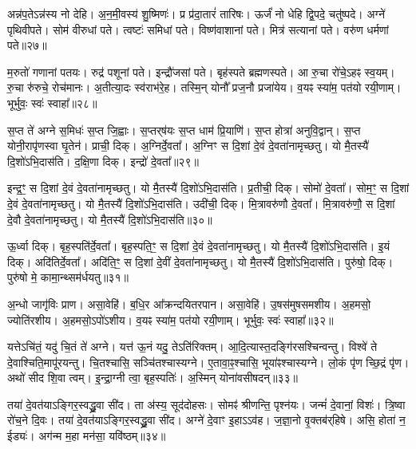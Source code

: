   अन्न॑प॒तेऽन्न॑स्य नो देहि।
   अ॒न॒मी॒वस्य॑ शु॒ष्मिणः॑।
   प्र प्र॑दा॒तारं॑ तारिषः।
   ऊर्जं॑ नो धेहि द्वि॒पदे॒ चतु॑ष्पदे।
   अग्ने॑ पृथिवीपते।
   सोम॑ वीरुधां पते।
   त्वष्टः॑ समिधां पते।
   विष्ण॑वाशानां पते।
   मित्र॑ सत्यानां पते।
   वरु॑ण धर्मणां पते॥२७॥

   म॒रुतो॑  गणानां पतयः।
   रुद्र॑ पशूनां पते।
   इन्द्रौ॑जसां पते।
   बृह॑स्पते ब्रह्मणस्पते।
   आ रु॒चा रो॑चे॒ऽहꣴ स्व॒यम्।
   रु॒चा रु॑रुचे॒ रोच॑मानः।
   अ॒तीत्या॒दः स्व॑राभ॑रे॒ह।
   तस्मि॒न् योनौ᳚ प्रज॒नौ प्रजा॑येय।
   व॒यꣴ स्या॑म॒ पत॑यो रयी॒णाम्।
   भूर्भुवः॒ स्वः॑ स्वाहा᳚॥२८॥
  \anuvakamend
  
    स॒प्त ते॑ अग्ने स॒मिधः॑ स॒प्त जि॒ह्वाः।
   स॒प्तर्{‌}ष॑यः स॒प्त धाम॑ प्रि॒याणि॑।
   स॒प्त होत्रा॑ अनुवि॒द्वान्।
   स॒प्त योनी॒रापृ॑णस्वा घृ॒तेन॑।
   प्राची॒ दिक्।
   अ॒ग्निर्दे॒वता᳚।
   अ॒ग्निꣳ स दि॒शां दे॒वं दे॒वता॑नामृच्छतु।
   यो मै॒तस्यै॑ दि॒शो॑ऽभि॒दास॑ति।
   द॒क्षि॒णा दिक्।
   इन्द्रो॑ दे॒वता᳚॥२९॥

   इन्द्र॒ꣳ॒ स दि॒शां दे॒वं दे॒वता॑नामृच्छतु।
   यो मै॒तस्यै॑ दि॒शो॑ऽभि॒दास॑ति।
   प्र॒तीची॒ दिक्।
   सोमो॑ दे॒वता᳚।
   सोम॒ꣳ॒ स दि॒शां दे॒वं दे॒वता॑नामृच्छतु।
   यो मै॒तस्यै॑ दि॒शो॑ऽभि॒दास॑ति।
   उदी॑ची॒ दिक्।
   मि॒त्रावरु॑णौ दे॒वता᳚।
   मि॒त्रावरु॑णौ॒ स दि॒शां दे॒वौ दे॒वता॑नामृच्छतु।
   यो मै॒तस्यै॑ दि॒शो॑ऽभि॒दास॑ति॥३०॥

   ऊ॒र्ध्वा दिक्।
   बृह॒स्पति॑र्दे॒वता᳚।
   बृह॒स्पति॒ꣳ॒ स दि॒शां दे॒वं दे॒वता॑नामृच्छतु।
   यो मै॒तस्यै॑ दि॒शो॑ऽभि॒दास॑ति।
   इ॒यं दिक्।
   अदि॑तिर्दे॒वता᳚।
   अदि॑ति॒ꣳ॒ स दि॒शां दे॒वीं दे॒वता॑नामृच्छतु।
   यो मै॒तस्यै॑ दि॒शो॑ऽभि॒दास॑ति।
   पुरु॑षो॒ दिक्।
   पुरु॑षो मे॒ कामा॒न्थ्सम॑र्धयतु॥३१॥
   
   अ॒न्धो जागृ॑विः प्राण।
   असा॒वेहि॑।
   ब॒धि॒र आ᳚क्रन्दयितरपान।
   असा॒वेहि॑।
   उ॒षस॑मुषसमशीय।
   अ॒हमसो॒ ज्योति॑रशीय।
   अ॒हमसो॒ऽपो॑ऽशीय।
   व॒यꣴ स्या॑म॒ पत॑यो रयी॒णाम्।
   भूर्भुवः॒ स्वः॑ स्वाहा᳚॥३२॥
\anuvakamend
  
   यत्तेऽचि॑तं॒ यदु॑ चि॒तं ते॑ अग्ने।
   यत्त॑ ऊ॒नं यदु॒ तेऽति॑रिक्तम्।
   आ॒दि॒त्यास्त॒दङ्गि॑रसश्चिन्वन्तु।
   विश्वे॑ ते दे॒वाश्चिति॒मापू॑रयन्तु।
   चि॒तश्चासि॒ सञ्चि॑तश्चास्यग्ने।
   ए॒तावा॒ꣴ॒श्चासि॒ भूया॑ꣴश्चास्यग्ने।
   लो॒कं पृ॑ण च्छि॒द्रं पृ॑ण।
   अथो॑ सीद शि॒वा त्वम्।
   इ॒न्द्रा॒ग्नी त्वा॒ बृह॒स्पतिः॑।
   अ॒स्मिन् योना॑वसीषदन्॥३३॥

   तया॑ दे॒वत॑याऽङ्गिर॒स्वद्ध्रु॒वा सी॑द।
   ता अ॑स्य॒ सूद॑दोहसः।
   सोमꣴ॑ श्रीणन्ति॒ पृश्न॑यः।
   जन्मं॑ दे॒वानां॒ विशः॑।
   त्रि॒ष्वा रो॑च॒ने दि॒वः।
   तया॑ दे॒वत॑याऽङ्गिर॒स्वद्ध्रु॒वा सी॑द।
   अग्ने॑ दे॒वाꣳ इ॒हाऽऽव॑ह।
   ज॒ज्ञा॒नो वृ॒क्तब॑र्{‌}हिषे।
   असि॒ होता॑ न॒ ईड्यः॑।
   अग॑न्म म॒हा मन॑सा॒ यवि॑ष्ठम्॥३४॥

